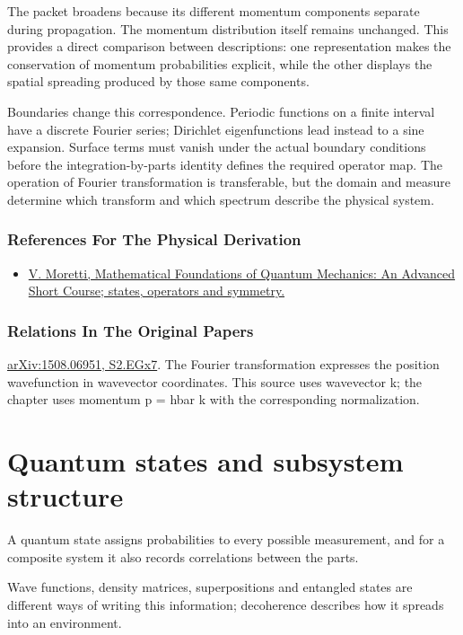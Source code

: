 \documentclass[11pt,oneside]{book}
\begin{document}
The packet broadens because its different momentum components separate during propagation. The momentum distribution itself remains unchanged. This provides a direct comparison between descriptions: one representation makes the conservation of momentum probabilities explicit, while the other displays the spatial spreading produced by those same components.

Boundaries change this correspondence. Periodic functions on a finite interval have a discrete Fourier series; Dirichlet eigenfunctions lead instead to a sine expansion. Surface terms must vanish under the actual boundary conditions before the integration-by-parts identity defines the required operator map. The operation of Fourier transformation is transferable, but the domain and measure determine which transform and which spectrum describe the physical system.

\subsection*{References For The Physical Derivation}
\begin{itemize}
\item \href{https://arxiv.org/abs/1508.06951}{V. Moretti, Mathematical Foundations of Quantum Mechanics: An Advanced Short Course; states, operators and symmetry.}
\end{itemize}

\subsection*{Relations In The Original Papers}

\href{https://arxiv.org/html/1508.06951#S2.EGx7}{arXiv:1508.06951, S2.EGx7}. The Fourier transformation expresses the position wavefunction in wavevector coordinates. This source uses wavevector k; the chapter uses momentum p = hbar k with the corresponding normalization.



\chapter{Quantum states and subsystem structure}

A quantum state assigns probabilities to every possible measurement, and for a composite system it also records correlations between the parts.

Wave functions, density matrices, superpositions and entangled states are different ways of writing this information; decoherence describes how it spreads into an environment.
\end{document}
